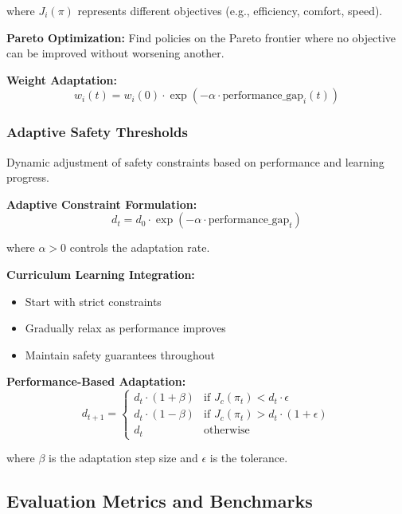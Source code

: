 \documentclass[12pt]{article}
\begin{document}
{{{{where $J_i(\pi)$ represents different objectives (e.g., efficiency, comfort, speed).

\textbf{Pareto Optimization:}
Find policies on the Pareto frontier where no objective can be improved without worsening another.

\textbf{Weight Adaptation:}
\begin{equation}
w_i(t) = w_i(0) \cdot \exp(-\alpha \cdot \text{performance\_gap}_i(t))
\end{equation}

\subsubsection{Adaptive Safety Thresholds}

Dynamic adjustment of safety constraints based on performance and learning progress.

\textbf{Adaptive Constraint Formulation:}
\begin{equation}
d_t = d_0 \cdot \exp(-\alpha \cdot \text{performance\_gap}_t)
\end{equation}

where $\alpha > 0$ controls the adaptation rate.

\textbf{Curriculum Learning Integration:}
\begin{itemize}
\item Start with strict constraints
\item Gradually relax as performance improves
\item Maintain safety guarantees throughout
\end{itemize}

\textbf{Performance-Based Adaptation:}
\begin{equation}
d_{t+1} = \begin{cases}
d_t \cdot (1 + \beta) & \text{if } J_c(\pi_t) < d_t \cdot \epsilon \\
d_t \cdot (1 - \beta) & \text{if } J_c(\pi_t) > d_t \cdot (1 + \epsilon) \\
d_t & \text{otherwise}
\end{cases}
\end{equation}

where $\beta$ is the adaptation step size and $\epsilon$ is the tolerance.

\subsection{Evaluation Metrics and Benchmarks}

}}}}
\end{document}
